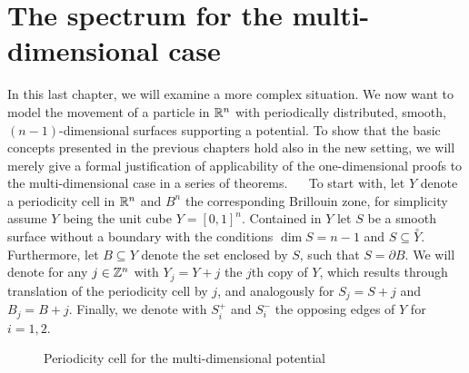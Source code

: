 \chapter{The spectrum for the multi-dimensional case} \label{chap5} %

In this last chapter, we will examine a more complex situation. We now want to model the movement of a particle in $\mathbb{R}^{n}$ with periodically distributed, smooth, $(n-1)$-dimensional surfaces supporting a potential. To show that the basic concepts presented in the previous chapters hold also in the new setting, we will merely give a formal justification of applicability of the one-dimensional proofs to the multi-dimensional case in a series of theorems.
~\newline ~\newline
To start with, let $Y$ denote a periodicity cell in $\mathbb{R}^{n}$ and $B^{n}$ the corresponding Brillouin zone, for simplicity assume $Y$ being the unit cube $Y = [0, 1]^{n}$. Contained in $Y$ let $S$ be a smooth surface without a boundary with the conditions $\dim S = n - 1$ and $S \subseteq \overset{\circ}{Y}$. Furthermore, let $B \subseteq Y$ denote the set enclosed by $S$, such that $S = \partial B$. We will denote for any $j \in \mathbb{Z}^{n}$ with $Y_{j} = Y + j$ the $j$th copy of $Y$, which results through translation of the periodicity cell by $j$, and analogously for $S_{j} = S + j$ and $B_{j} = B + j$. Finally, we denote with $S_{i}^{+}$ and $S_{i}^{-}$ the opposing edges of $Y$ for $i = 1, 2$.

\begin{figure}[!ht] \centering
	\caption{Periodicity cell for the multi-dimensional potential}
\end{figure}

